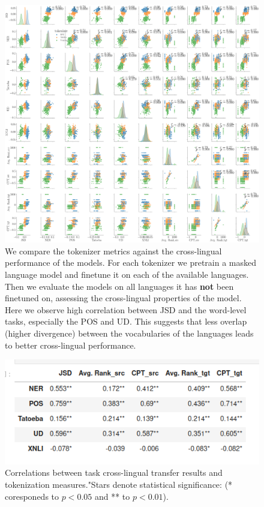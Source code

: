\begin{figure}[H]
    \centering
    \includegraphics[width=\textwidth]{img/temp/X_pair_analysis_20L.png}
    \caption{We compare the tokenizer metrics against the cross-lingual performance of the models. For each tokenizer we pretrain a masked language model and finetune it on each of the available languages. Then we evaluate the models on all languages it has \textbf{not} been finetuned on, assessing the cross-lingual properties of the model. Here we observe high correlation between JSD and the word-level tasks, especially the POS and UD. This suggests that less overlap (higher divergence) between the vocabularies of the languages leads to better cross-lingual performance.
    }
    \label{fig:X_pair_analysis_20L}
\end{figure}



\begin{figure}[H]
    \centering
    \includegraphics[width=\textwidth]{img/temp/corr_x_lang_20l.png}
    \caption{Correlations between task cross-lingual transfer results and tokenization measures."Stars denote statistical significance: (* coresponeds to $p<0.05$ and ** to $p<0.01$).}
    \label{fig:corr_x_lang_20l}
\end{figure}

